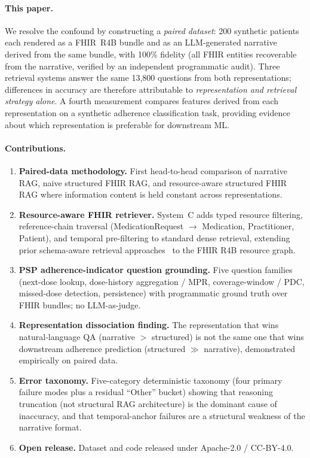 \paragraph{This paper.}
We resolve the confound by constructing a \emph{paired dataset}: 200 synthetic patients
each rendered as a FHIR~R4B bundle and as an LLM-generated narrative derived from the
same bundle, with 100\% fidelity (all FHIR entities recoverable from the narrative,
verified by an independent programmatic audit).  Three retrieval systems answer the same
13,800 questions from both representations; differences in accuracy are therefore attributable
to \emph{representation and retrieval strategy alone}.  A fourth measurement compares features
derived from each representation on a synthetic adherence classification task, providing
evidence about which representation is preferable for downstream ML.

\paragraph{Contributions.}
\begin{enumerate}
\item \textbf{Paired-data methodology.}  First head-to-head comparison of narrative RAG,
  naive structured FHIR RAG, and resource-aware structured FHIR RAG where information content
  is held constant across representations.

\item \textbf{Resource-aware FHIR retriever.}  System~C adds typed resource filtering,
  reference-chain traversal (MedicationRequest $\rightarrow$ Medication, Practitioner,
  Patient), and temporal pre-filtering to standard dense retrieval, extending prior
  schema-aware retrieval approaches~\citep{jiang2023structgpt} to the FHIR R4B resource
  graph.

\item \textbf{PSP adherence-indicator question grounding.}  Five question families (next-dose
  lookup, dose-history aggregation / MPR, coverage-window / PDC, missed-dose detection,
  persistence) with programmatic ground truth over FHIR bundles; no LLM-as-judge.

\item \textbf{Representation dissociation finding.}  The representation that wins
  natural-language QA (narrative $>$ structured) is not the same one that wins downstream
  adherence prediction (structured $\gg$ narrative), demonstrated empirically on paired data.

\item \textbf{Error taxonomy.}  Five-category deterministic taxonomy (four primary failure modes plus a residual ``Other'' bucket) showing that reasoning truncation (not structural RAG architecture) is the dominant cause
  of inaccuracy, and that temporal-anchor failures are a structural weakness of the
  narrative format.

\item \textbf{Open release.}  Dataset and code released under Apache-2.0 / CC-BY-4.0.
\end{enumerate}
